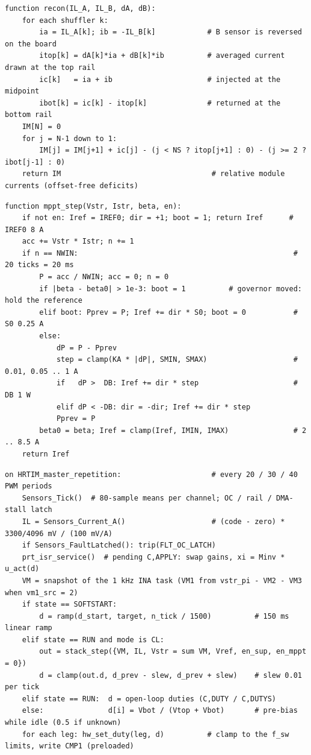 \begin{lstlisting}[caption={Module-current reconstruction by KCL (\code{shuffler\_recon.c}); the string current is unobservable so $I_N = 0$ is the reference.},label={lst:recon}]
function recon(IL_A, IL_B, dA, dB):
    for each shuffler k:
        ia = IL_A[k]; ib = -IL_B[k]            # B sensor is reversed on the board
        itop[k] = dA[k]*ia + dB[k]*ib          # averaged current drawn at the top rail
        ic[k]   = ia + ib                      # injected at the midpoint
        ibot[k] = ic[k] - itop[k]              # returned at the bottom rail
    IM[N] = 0
    for j = N-1 down to 1:
        IM[j] = IM[j+1] + ic[j] - (j < NS ? itop[j+1] : 0) - (j >= 2 ? ibot[j-1] : 0)
    return IM                                   # relative module currents (offset-free deficits)
\end{lstlisting}

\begin{lstlisting}[caption={Adaptive-step perturb-and-observe MPPT, 1\,ms (\code{shuffler\_mppt.c}); compiled in but disabled on hardware because the load performs the string MPPT.},label={lst:mppt}]
function mppt_step(Vstr, Istr, beta, en):
    if not en: Iref = IREF0; dir = +1; boot = 1; return Iref      # IREF0 8 A
    acc += Vstr * Istr; n += 1
    if n == NWIN:                                                  # 20 ticks = 20 ms
        P = acc / NWIN; acc = 0; n = 0
        if |beta - beta0| > 1e-3: boot = 1          # governor moved: hold the reference
        elif boot: Pprev = P; Iref += dir * S0; boot = 0           # S0 0.25 A
        else:
            dP = P - Pprev
            step = clamp(KA * |dP|, SMIN, SMAX)                    # 0.01, 0.05 .. 1 A
            if   dP >  DB: Iref += dir * step                      # DB 1 W
            elif dP < -DB: dir = -dir; Iref += dir * step
            Pprev = P
        beta0 = beta; Iref = clamp(Iref, IMIN, IMAX)               # 2 .. 8.5 A
    return Iref
\end{lstlisting}

\begin{lstlisting}[caption={Control ISR, 10\,kHz (HRTIM master repetition interrupt, \code{app.c}).},label={lst:isr}]
on HRTIM_master_repetition:                     # every 20 / 30 / 40 PWM periods
    Sensors_Tick()  # 80-sample means per channel; OC / rail / DMA-stall latch
    IL = Sensors_Current_A()                    # (code - zero) * 3300/4096 mV / (100 mV/A)
    if Sensors_FaultLatched(): trip(FLT_OC_LATCH)
    prt_isr_service()  # pending C,APPLY: swap gains, xi = Minv * u_act(d)
    VM = snapshot of the 1 kHz INA task (VM1 from vstr_pi - VM2 - VM3 when vm1_src = 2)
    if state == SOFTSTART:
        d = ramp(d_start, target, n_tick / 1500)          # 150 ms linear ramp
    elif state == RUN and mode is CL:
        out = stack_step({VM, IL, Vstr = sum VM, Vref, en_sup, en_mppt = 0})
        d = clamp(out.d, d_prev - slew, d_prev + slew)    # slew 0.01 per tick
    elif state == RUN:  d = open-loop duties (C,DUTY / C,DUTYS)
    else:               d[i] = Vbot / (Vtop + Vbot)       # pre-bias while idle (0.5 if unknown)
    for each leg: hw_set_duty(leg, d)          # clamp to the f_sw limits, write CMP1 (preloaded)
\end{lstlisting}

